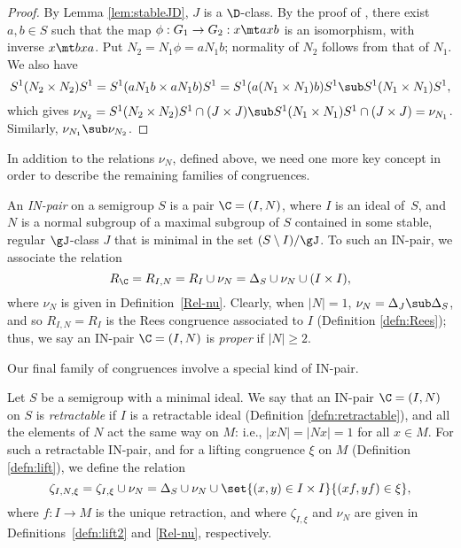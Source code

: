 \begin{proof}
By Lemma \ref{lem:stableJD}, $J$ is a $\D$-class.
By the proof of \cite[Proposition 2.3.6]{Howie}, there exist $a,b\in S$ such that the map ${\phi:G_1\to G_2:x\mt axb}$ is an isomorphism, with inverse $x\mt bxa$.
Put $N_2=N_1\phi=aN_1b$; normality of $N_2$ follows from that of $N_1$.  We also have
\[
S^1(N_2\times N_2)S^1 = S^1(aN_1b\times aN_1b)S^1 = S^1(a(N_1\times N_1)b)S^1 \sub S^1(N_1\times N_1)S^1,
\]
which gives $\nu_{N_2} = S^1(N_2\times N_2)S^1 \cap (J\times J) \sub S^1(N_1\times N_1)S^1 \cap (J\times J) = \nu_{N_1}$.  Similarly, $\nu_{N_1}\sub\nu_{N_2}$.
\end{proof}

In addition to the relations $\nu_N$, defined above, we need one more key concept in order to describe the remaining families of congruences.

\begin{definition}
\label{defn:RC}
  An \emph{IN-pair} on a semigroup $S$ is a pair $\C=(I,N)$, where
  $I$ is an ideal of~$S$, and $N$ is a normal subgroup of a maximal subgroup of
  $S$ contained in some stable, regular $\gJ$-class $J$ that is minimal in the set
  $(S\setminus I)/{\gJ}$.
  To such an IN-pair, we associate the relation
  \[
  R_\C = R_{I,N} = R_I\cup\nu_N=\Delta_S \cup \nu_N \cup (I\times I),
  \]
  where $\nu_N$ is given in Definition~\ref{Rel-nu}.
%
Clearly, when $|N|=1$, $\nu_N=\Delta_J\sub\Delta_S$, and so $R_{I,N}=R_I$ is the Rees congruence associated to $I$ (Definition \ref{defn:Rees}); thus, we say an IN-pair $\C=(I,N)$ is \emph{proper} if $|N|\geq2$.
\end{definition}


Our final family of congruences involve a special kind of IN-pair.

\begin{definition}
\label{defn:lrmC0}
Let $S$ be a semigroup with a minimal ideal.
  We say that an IN-pair $\C=(I,N)$ on $S$ is
  \emph{retractable} if $I$ is a retractable ideal (Definition \ref{defn:retractable}), and all the elements of $N$ act the same way on $M$: i.e., $|xN|=|Nx|=1$ for all $x\in M$.
  For such a retractable IN-pair, and for a lifting congruence $\xi$ on $M$ (Definition \ref{defn:lift}), we
  define the relation
\[
\zeta_{I,N,\xi} = \zeta_{I,\xi}\cup\nu_N = \Delta_S\cup\nu_N\cup\set{(x,y)\in I\times I}{(xf,yf) \in \xi},
\]
where $f:I\to M$ is the unique retraction, and where $\zeta_{I, \xi}$ and $\nu_N$ are given in Definitions~\ref{defn:lift2} and \ref{Rel-nu}, respectively.
\end{definition}

